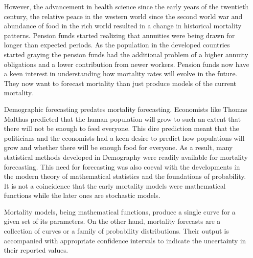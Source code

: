 \documentclass{article}
\numberwithin{equation}{section}
\begin{document}
However, the advancement in health science since the early years of the 
twentieth century, the relative peace in the western world since the second 
world war and abundance of food in the rich world resulted in a change in
historical mortality patterns. Pension funds started realizing that annuities
were being drawn for longer than expected periods. As the population in the
developed countries started graying the pension funds had the additional 
problem of a higher annuity obligations and a lower contribution from newer
workers. Pension funds now have a keen interest in understanding how mortality 
rates will evolve in the future. They now want to forecast mortality than just
produce models of the current mortality. 

Demographic forecasting predates mortality forecasting. Economists like Thomas
Malthus predicted that the human population will grow to such an extent that
there will not be enough to feed everyone. This dire prediction meant that the
politicians and the economists had a keen desire to predict how populations
will grow and whether there will be enough food for everyone. As a result, many 
statistical methods developed in Demography were readily available for mortality
forecasting. This need for forecasting was also coeval with the developments
in the modern theory of mathematical statistics and the foundations of
probability. It is not a coincidence that the early mortality models were
mathematical functions while the later ones are stochastic models.

Mortality models, being mathematical functions, produce a single curve for
a given set of its parameters. On the other hand, mortality forecasts are a
collection of curves or a family of probability distributions. Their output
is accompanied with appropriate confidence intervals to indicate the 
uncertainty in their reported values.
\end{document}
